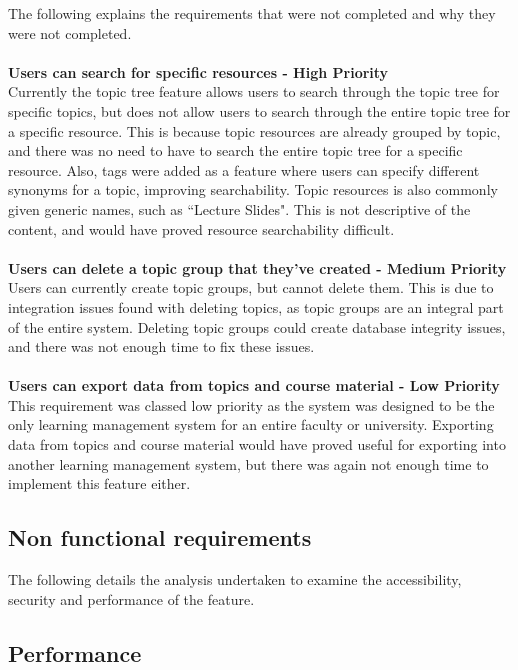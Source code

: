 The following explains the requirements that were not completed and why they were not completed.\\
\\
\textbf{Users can search for specific resources - High Priority} \\
Currently the topic tree feature allows users to search through the topic tree for specific topics, but does not allow users to search through the entire topic tree for a specific resource. This is because topic resources are already grouped by topic, and there was no need to have to search the entire topic tree for a specific resource. Also, tags were added as a feature where users can specify different synonyms for a topic, improving searchability. Topic resources is also commonly given generic names, such as ``Lecture Slides". This is not descriptive of the content, and would have proved resource searchability difficult. \\
\\
\textbf{Users can delete a topic group that they've created - Medium Priority}\\
Users can currently create topic groups, but cannot delete them. This is due to integration issues found with deleting topics, as topic groups are an integral part of the entire system. Deleting topic groups could create database integrity issues, and there was not enough time to fix these issues.\\
\\
\textbf{Users can export data from topics and course material - Low Priority} \\
This requirement was classed low priority as the system was designed to be the only learning management system for an entire faculty or university. Exporting data from topics and course material would have proved useful for exporting into another learning management system, but there was again not enough time to implement this feature either.\\

\subsection {Non functional requirements}

The following details the analysis undertaken to examine the accessibility, security and performance of the feature. 

\subsection {Performance}

